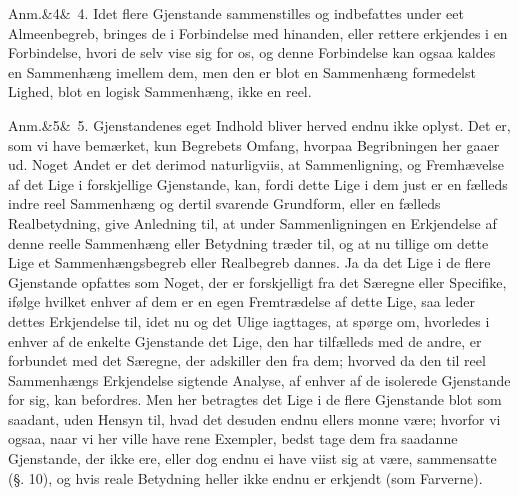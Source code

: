 \documentclass[12pt]{book}
\def\sperr#1{#1}%
\def\textit#1{#1}%
\def\emph#1{#1}%
\newcommand{\sperr}[1]{\textls[180]{#1}}
\newcommand{\anm}[1]{%
  \par\vspace{0.5\baselineskip}%
  \noindent\hspace{\parindent}\sperr{Anm.}\ifx&#1&\else~\textit{#1}.\fi
  \enspace\ignorespaces
}
\newcommand{\opage}[1]{\marginnote{\footnotesize\textit{[#1]}}}
\begin{document}
\anm{4} Idet flere Gjenstande sammenstilles og indbefattes under eet Almeenbegreb,
bringes de i Forbindelse med hinanden, eller rettere erkjendes i en Forbindelse,
hvori de selv vise sig for os, og denne Forbindelse kan ogsaa kaldes en Sammenhæng
imellem dem, men den
\opage{192} er blot en Sammenhæng formedelst Lighed, blot en \emph{logisk Sammenhæng}, ikke en
reel.

\anm{5} Gjenstandenes eget Indhold bliver herved endnu ikke oplyst. Det er, som vi
have bemærket, kun Begrebets Omfang, hvorpaa Begribningen her gaaer ud. Noget Andet
er det derimod naturligviis, at Sammenligning, og Fremhævelse af det Lige i
forskjellige Gjenstande, kan, fordi dette Lige i dem just er en fælleds indre reel
Sammenhæng og dertil svarende Grundform, eller en fælleds Realbetydning, give
Anledning til, at under Sammenligningen en Erkjendelse af denne reelle Sammenhæng
eller Betydning træder til, og at nu tillige om dette Lige et Sammenhængsbegreb
eller Realbegreb dannes. Ja da det Lige i de flere Gjenstande opfattes som Noget,
der er forskjelligt fra det Særegne eller Specifike, ifølge hvilket enhver af dem er
en egen Fremtrædelse af dette Lige, saa leder dettes Erkjendelse til, idet nu og det
Ulige iagttages, at spørge om, hvorledes i enhver af de enkelte Gjenstande det Lige,
den har tilfælleds med de andre, er forbundet med det Særegne, der adskiller den fra
dem; hvorved da den til reel Sammenhængs Erkjendelse sigtende Analyse, af enhver af
de isolerede Gjenstande for sig, kan befordres. Men her betragtes det Lige i de
flere Gjenstande blot som saadant, uden Hensyn til, hvad det desuden endnu ellers
monne være; hvorfor vi ogsaa, naar vi her ville have rene Exempler, bedst tage dem
fra
\opage{193} %
saadanne Gjenstande, der ikke ere, eller dog endnu ei have viist sig at være,
sammensatte (§. 10), og hvis reale Betydning heller ikke endnu er erkjendt (som
Farverne).
\end{document}
